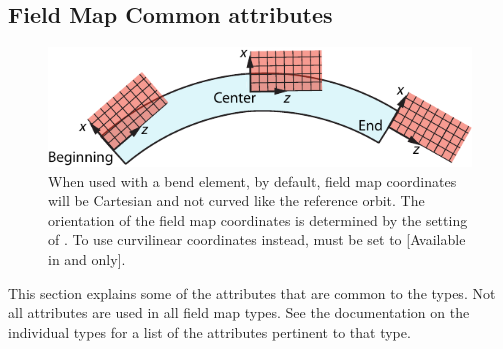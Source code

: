 \subsection{Field Map Common attributes}
\label{s:fieldmap.com}

\begin{figure}[tb]
  \centering
  \includegraphics{bend-grid-coords.pdf}
  \caption[ coordinates when used with a bend element.]{
When used with a bend element, by default, field map coordinates will be Cartesian and not curved
like the reference orbit. The orientation of the field map coordinates is determined by the setting
of . To use curvilinear coordinates instead,  must be set to
 [Available in  and  only].}
  \label{f:bend.grid}
\end{figure}

This section explains some of the attributes that are common to the 
types. Not all attributes are used in all field map types. See the documentation on the
individual types for a list of the attributes pertinent to that type.

